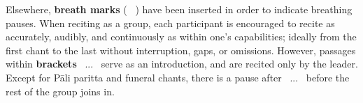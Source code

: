 \begin{justify}
  Elsewhere, \textbf{breath marks} ( \abbrbreathmark\ ) have been inserted in order to indicate breathing pauses. When reciting as a group, each participant is encouraged to recite as accurately, audibly, and continuously as within one's capabilities; ideally from the first chant to the last without interruption, gaps, or omissions. However, passages within \textbf{brackets} \anglebracketleft\ \hspace{-0.5mm}... \hspace{-0.8mm}\anglebracketright\ serve as an introduction, and are recited only by the leader. Except for Pāli paritta and funeral chants, there is a pause after \anglebracketleft\ \hspace{-0.5mm}... \hspace{-0.8mm}\anglebracketright\, before the rest of the group joins in.
\end{justify}

\clearpage
